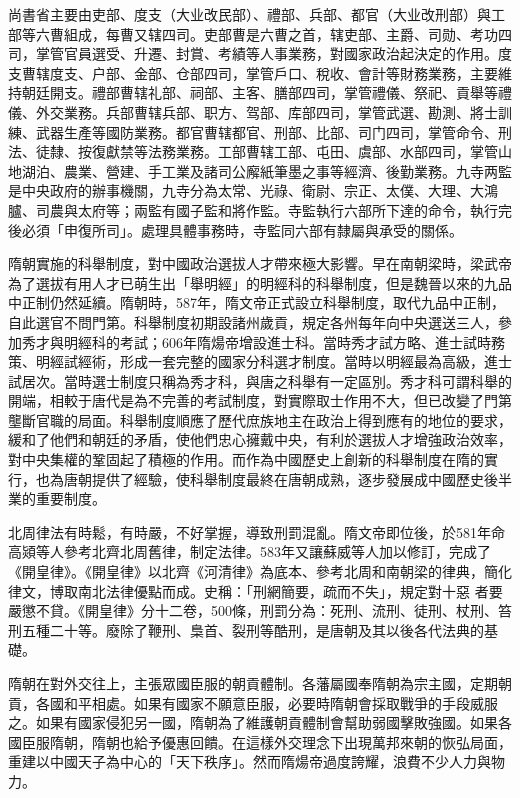 尚書省主要由吏部、度支（大业改民部）、禮部、兵部、都官（大业改刑部）與工部等六曹組成，每曹又辖四司。吏部曹是六曹之首，辖吏部、主爵、司勋、考功四司，掌管官員選受、升遷、封賞、考績等人事業務，對國家政治起決定的作用。度支曹辖度支、户部、金部、仓部四司，掌管戶口、稅收、會計等財務業務，主要維持朝廷開支。禮部曹辖礼部、祠部、主客、膳部四司，掌管禮儀、祭祀、貢舉等禮儀、外交業務。兵部曹辖兵部、职方、驾部、库部四司，掌管武選、勘測、將士訓練、武器生產等國防業務。都官曹辖都官、刑部、比部、司门四司，掌管命令、刑法、徒隸、按復獻禁等法務業務。工部曹辖工部、屯田、虞部、水部四司，掌管山地湖泊、農業、營建、手工業及諸司公廨紙筆墨之事等經濟、後勤業務。九寺两監是中央政府的辦事機關，九寺分為太常、光祿、衛尉、宗正、太僕、大理、大鴻臚、司農與太府等；兩監有國子監和將作監。寺監執行六部所下達的命令，執行完後必須「申復所司」。處理具體事務時，寺監同六部有隸屬與承受的關係。

隋朝實施的科舉制度，對中國政治選拔人才帶來極大影響。早在南朝梁時，梁武帝為了選拔有用人才已萌生出「舉明經」的明經科的科舉制度，但是魏晉以來的九品中正制仍然延續。隋朝時，587年，隋文帝正式設立科舉制度，取代九品中正制，自此選官不問門第。科舉制度初期設諸州歲貢，規定各州每年向中央選送三人，參加秀才與明經科的考試；606年隋煬帝增設進士科。當時秀才試方略、進士試時務策、明經試經術，形成一套完整的國家分科選才制度。當時以明經最為高級，進士試居次。當時選士制度只稱為秀才科，與唐之科舉有一定區別。秀才科可謂科舉的開端，相較于唐代是為不完善的考試制度，對實際取士作用不大，但已改變了門第壟斷官職的局面。科舉制度順應了歷代庶族地主在政治上得到應有的地位的要求，緩和了他們和朝廷的矛盾，使他們忠心擁戴中央，有利於選拔人才增強政治效率，對中央集權的鞏固起了積極的作用。而作為中國歷史上創新的科舉制度在隋的實行，也為唐朝提供了經驗，使科舉制度最終在唐朝成熟，逐步發展成中國歷史後半業的重要制度。

北周律法有時鬆，有時嚴，不好掌握，導致刑罰混亂。隋文帝即位後，於581年命高熲等人參考北齊北周舊律，制定法律。583年又讓蘇威等人加以修訂，完成了《開皇律》。《開皇律》以北齊《河清律》為底本、參考北周和南朝梁的律典，簡化律文，博取南北法律優點而成。史稱：「刑網簡要，疏而不失」，規定對十惡 者要嚴懲不貸。《開皇律》分十二卷，500條，刑罰分為：死刑、流刑、徒刑、杖刑、笞刑五種二十等。廢除了鞭刑、梟首、裂刑等酷刑，是唐朝及其以後各代法典的基礎。

隋朝在對外交往上，主張眾國臣服的朝貢體制。各藩屬國奉隋朝為宗主國，定期朝貢，各國和平相處。如果有國家不願意臣服，必要時隋朝會採取戰爭的手段威服之。如果有國家侵犯另一國，隋朝為了維護朝貢體制會幫助弱國擊敗強國。如果各國臣服隋朝，隋朝也給予優惠回饋。在這樣外交理念下出現萬邦來朝的恢弘局面，重建以中國天子為中心的「天下秩序」。然而隋煬帝過度誇耀，浪費不少人力與物力。

